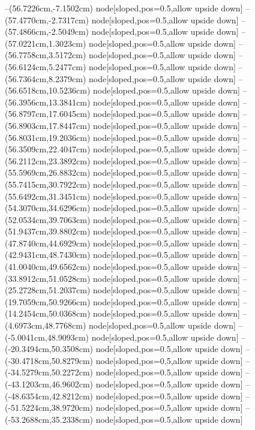 --(56.7226cm,-7.1502cm) node[sloped,pos=0.5,allow upside down]{\ArrowIn}
--(57.4770cm,-2.7317cm) node[sloped,pos=0.5,allow upside down]{\ArrowIn}
--(57.4866cm,-2.5049cm) node[sloped,pos=0.5,allow upside down]{\arrowIn}
--(57.0221cm,1.3023cm) node[sloped,pos=0.5,allow upside down]{\ArrowIn}
--(56.7758cm,3.5172cm) node[sloped,pos=0.5,allow upside down]{\ArrowIn}
--(56.6124cm,5.2477cm) node[sloped,pos=0.5,allow upside down]{\ArrowIn}
--(56.7364cm,8.2379cm) node[sloped,pos=0.5,allow upside down]{\ArrowIn}
--(56.6518cm,10.5236cm) node[sloped,pos=0.5,allow upside down]{\ArrowIn}
--(56.3956cm,13.3841cm) node[sloped,pos=0.5,allow upside down]{\ArrowIn}
--(56.8797cm,17.6045cm) node[sloped,pos=0.5,allow upside down]{\ArrowIn}
--(56.8903cm,17.8447cm) node[sloped,pos=0.5,allow upside down]{\arrowIn}
--(56.8031cm,19.2036cm) node[sloped,pos=0.5,allow upside down]{\ArrowIn}
--(56.3509cm,22.4047cm) node[sloped,pos=0.5,allow upside down]{\ArrowIn}
--(56.2112cm,23.3892cm) node[sloped,pos=0.5,allow upside down]{\arrowIn}
--(55.5969cm,26.8832cm) node[sloped,pos=0.5,allow upside down]{\ArrowIn}
--(55.7415cm,30.7922cm) node[sloped,pos=0.5,allow upside down]{\ArrowIn}
--(55.6492cm,31.3451cm) node[sloped,pos=0.5,allow upside down]{\arrowIn}
--(54.3070cm,34.6296cm) node[sloped,pos=0.5,allow upside down]{\ArrowIn}
--(52.0534cm,39.7063cm) node[sloped,pos=0.5,allow upside down]{\ArrowIn}
--(51.9437cm,39.8802cm) node[sloped,pos=0.5,allow upside down]{\arrowIn}
--(47.8740cm,44.6929cm) node[sloped,pos=0.5,allow upside down]{\ArrowIn}
--(42.9431cm,48.7430cm) node[sloped,pos=0.5,allow upside down]{\ArrowIn}
--(41.0040cm,49.6562cm) node[sloped,pos=0.5,allow upside down]{\ArrowIn}
--(33.8912cm,51.0528cm) node[sloped,pos=0.5,allow upside down]{\ArrowIn}
--(25.2728cm,51.2037cm) node[sloped,pos=0.5,allow upside down]{\ArrowIn}
--(19.7059cm,50.9266cm) node[sloped,pos=0.5,allow upside down]{\ArrowIn}
--(14.2454cm,50.0368cm) node[sloped,pos=0.5,allow upside down]{\ArrowIn}
--(4.6973cm,48.7768cm) node[sloped,pos=0.5,allow upside down]{\ArrowIn}
--(-5.0041cm,48.9093cm) node[sloped,pos=0.5,allow upside down]{\ArrowIn}
--(-20.3494cm,50.3508cm) node[sloped,pos=0.5,allow upside down]{\ArrowIn}
--(-30.4718cm,50.8279cm) node[sloped,pos=0.5,allow upside down]{\ArrowIn}
--(-34.5279cm,50.2272cm) node[sloped,pos=0.5,allow upside down]{\ArrowIn}
--(-43.1203cm,46.9602cm) node[sloped,pos=0.5,allow upside down]{\ArrowIn}
--(-48.6354cm,42.8212cm) node[sloped,pos=0.5,allow upside down]{\ArrowIn}
--(-51.5224cm,38.9720cm) node[sloped,pos=0.5,allow upside down]{\ArrowIn}
--(-53.2688cm,35.2338cm) node[sloped,pos=0.5,allow upside down]{\ArrowIn}
